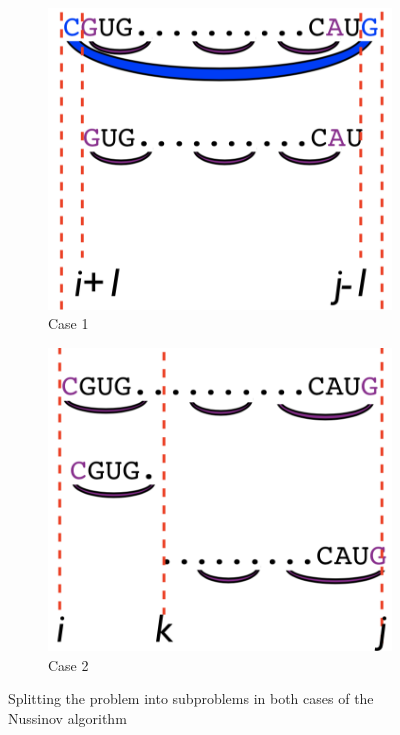 \documentclass[12pt]{article}
\begin{document}
\begin{figure}[h]
    \centering
    \begin{subfigure}[b]{.45\textwidth}
    \includegraphics[width=\textwidth]{case1.png}
    \caption{Case 1}
    \end{subfigure}
    \hfill
    \begin{subfigure}[b]{.45\textwidth}
    \includegraphics[width=\textwidth]{case2.png}
    \caption{Case 2}
    \end{subfigure}
    \caption{Splitting the problem into subproblems in both cases of the Nussinov algorithm}
    \label{fig:cases}
\end{figure}
\end{document}
